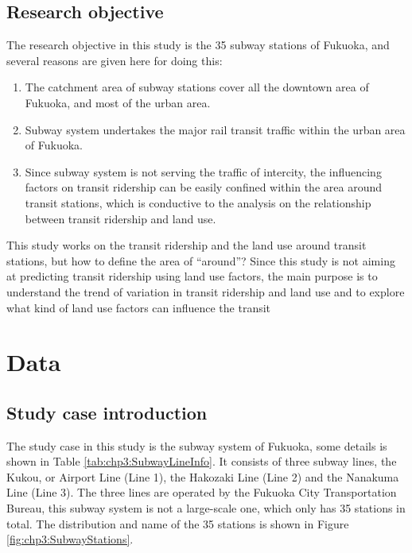 %
\subsection{Research objective}
%
The research objective in this study is the 35 subway stations of Fukuoka, and several reasons are given here for doing this:

%
\begin{enumerate}
	\setlength{\parskip}{0\baselineskip} %
	\item The catchment area of subway stations cover all the downtown area of Fukuoka, and most of the urban area. 
	\item Subway system undertakes the major rail transit traffic within the urban area of Fukuoka. 
	\item Since subway system is not serving the traffic of intercity, the influencing factors on transit ridership can be easily confined within the area around transit stations, which is conductive to the analysis on the relationship between transit ridership and land use.
	\setlength{\parskip}{0.7\baselineskip} %
\end{enumerate}

%
This study works on the transit ridership and the land use around transit stations, but how to define the area of “around”? Since this study is not aiming at predicting transit ridership using land use factors, the main purpose is to understand the trend of variation in transit ridership and land use and to explore what kind of land use factors can influence the transit 



%
\section{Data}
\subsection{Study case introduction}
%
The study case in this study is the subway system of Fukuoka, some details is shown in Table \ref{tab:chp3:SubwayLineInfo}. It consists of three subway lines, the Kukou, or Airport Line (Line 1), the Hakozaki Line (Line 2) and the Nanakuma Line (Line 3). The three lines are operated by the Fukuoka City Transportation Bureau, this subway system is not a large-scale one, which only has 35 stations in total. The distribution and name of the 35 stations is shown in Figure \ref{fig:chp3:SubwayStations}.


